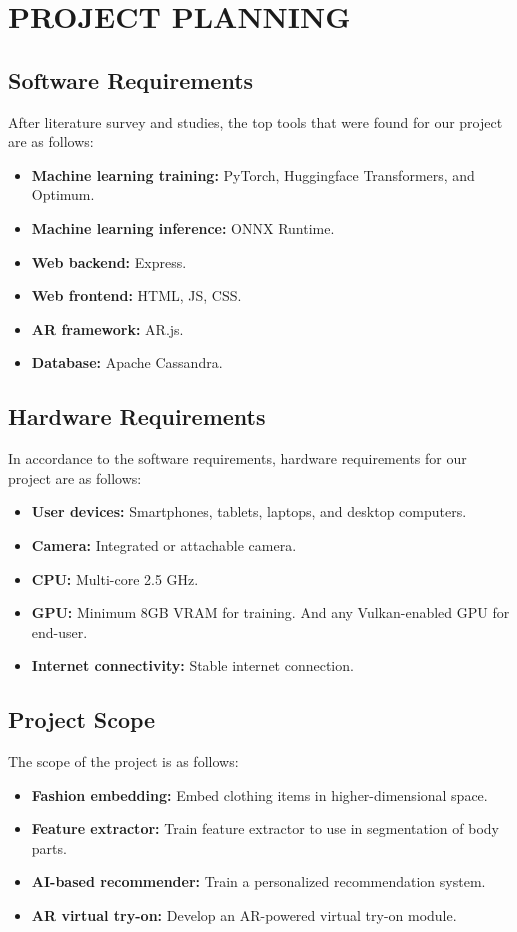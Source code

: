 \chapter{PROJECT PLANNING}

\section{Software Requirements}
	After literature survey and studies, the top tools that were found for our project are as follows:

	\begin{itemize}
		\item \textbf{Machine learning training:} PyTorch, Huggingface Transformers, and Optimum.
		\item \textbf{Machine learning inference:} ONNX Runtime.
		\item \textbf{Web backend:} Express.
		\item \textbf{Web frontend:} HTML, JS, CSS.
		\item \textbf{AR framework:} AR.js.
		\item \textbf{Database:} Apache Cassandra.
	\end{itemize}

\section{Hardware Requirements}
	In accordance to the software requirements, hardware requirements for our project are as follows:

	\begin{itemize}
		\item \textbf{User devices:} Smartphones, tablets, laptops, and desktop computers.
		\item \textbf{Camera:} Integrated or attachable camera.
		\item \textbf{CPU:} Multi-core 2.5 GHz.
		\item \textbf{GPU:} Minimum 8GB VRAM for training. And any Vulkan-enabled GPU for end-user.
		\item \textbf{Internet connectivity:} Stable internet connection.
	\end{itemize}

\section{Project Scope}
	The scope of the project is as follows:
	
	\begin{itemize}
		\item \textbf{Fashion embedding:} Embed clothing items in higher-dimensional space.
		\item \textbf{Feature extractor:} Train feature extractor to use in segmentation of body parts.
		\item \textbf{AI-based recommender:} Train a personalized recommendation system.
		\item \textbf{AR virtual try-on:} Develop an AR-powered virtual try-on module.
	\end{itemize}

